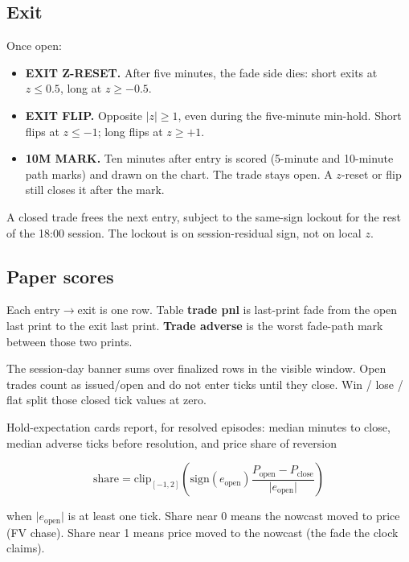 \documentclass[11pt]{article}
\newcommand{\code}[1]{\texttt{\detokenize{#1}}}
\newcommand{\abs}[1]{\lvert #1 \rvert}
\begin{document}
\subsection{Exit}

Once open:

\begin{itemize}
    \item \textbf{EXIT Z-RESET.}
    After five minutes, the fade side dies:
    short exits at \(z\le 0.5\), long at \(z\ge -0.5\).
    \item \textbf{EXIT FLIP.}
    Opposite \(\abs{z}\ge 1\), even during the five-minute min-hold.
    Short flips at \(z\le -1\); long flips at \(z\ge +1\).
    \item \textbf{10M MARK.}
    Ten minutes after entry is scored (5-minute and 10-minute path
    marks) and drawn on the chart.  The trade stays open.  A
    \(z\)-reset or flip still closes it after the mark.
\end{itemize}

A closed trade frees the next entry, subject to the same-sign lockout
for the rest of the 18:00 session.  The lockout is on session-residual
sign, not on local \(z\).

\subsection{Paper scores}

Each entry\(\rightarrow\)exit is one row.  Table \textbf{trade pnl} is
last-print fade from the open last print to the exit last print.
\textbf{Trade adverse} is the worst fade-path mark between those two
prints.

The session-day banner sums \code{dir_pnl_trade_ticks} over finalized
rows in the visible window.  Open trades count as issued/open and do
not enter ticks until they close.  Win / lose / flat split those
closed tick values at zero.

Hold-expectation cards report, for resolved episodes: median minutes
to close, median adverse ticks before resolution, and price share of
reversion

\begin{equation}
  \mathrm{share}
  =
  \mathrm{clip}_{[-1,2]}
  \left(
    \mathrm{sign}(e_{\mathrm{open}})
    \frac{P_{\mathrm{open}}-P_{\mathrm{close}}}{\abs{e_{\mathrm{open}}}}
  \right)
\end{equation}

when \(\abs{e_{\mathrm{open}}}\) is at least one tick.  Share near 0
means the nowcast moved to price (FV chase).  Share near 1 means price
moved to the nowcast (the fade the clock claims).
\end{document}
